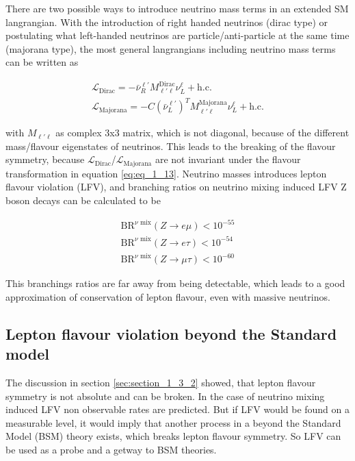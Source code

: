 There are two possible ways to introduce neutrino mass terms in an extended \gls{SM} langrangian. With the introduction of right handed neutrinos (dirac type) or postulating what left-handed neutrinos are particle/anti-particle at the same time (majorana type), the most general langrangians including neutrino mass terms \cite{NEUTRINOMASS} can be written as 

\begin{equation}
	\label{eq:eq_1_15}
	\begin{split}
		\mathcal{L}_{\text{Dirac}} = -\bar{\nu}^{\ell'}_{R}M^{\text{Dirac}}_{\ell'\ell} \nu^{\ell}_{L} + \text{h.c.} \\
		\mathcal{L}_{\text{Majorana}} = -C(\bar{\nu}^{\ell'}_{L})^{T}M^{\text{Majorana}}_{\ell'\ell} \nu^{\ell}_{L} + \text{h.c.} 
	\end{split}
\end{equation}

with $M_{\ell'\ell}$ as complex 3x3 matrix, which is not diagonal, because of the different mass/flavour eigenstates of neutrinos. This leads to the breaking of the flavour symmetry, because $\mathcal{L}_{\text{Dirac}}$/$\mathcal{L}_{\text{Majorana}}$ are not invariant under the flavour transformation in equation \ref{eq:eq_1_13}. Neutrino masses introduces lepton flavour violation (\gls{LFV}), and branching ratios on neutrino mixing induced \gls{LFV} Z boson decays \cite{NEUTRINOLFV} can be calculated to be 

\begin{equation}
	\label{eq:eq_1_16}
	\begin{split}
		\text{BR}^{\nu \text{ mix}}(Z\to e\mu) < 10^{-55} \\
		\text{BR}^{\nu \text{ mix}}(Z\to e\tau) < 10^{-54} \\
		\text{BR}^{\nu \text{ mix}}(Z\to \mu\tau) < 10^{-60}
	\end{split}
\end{equation}

This branchings ratios are far away from being detectable, which leads to a good approximation of conservation of lepton flavour, even with massive neutrinos.

\subsection{Lepton flavour violation beyond the Standard model}
\label{sec:section_1_3_3}

The discussion in section \ref{sec:section_1_3_2} showed, that lepton flavour symmetry is not absolute and can be broken. In the case of neutrino mixing induced \gls{LFV} non observable rates are predicted. But if \gls{LFV} would be found on a measurable level, it would imply that another process in a beyond the Standard Model (\gls{BSM}) theory exists, which breaks lepton flavour symmetry. So \gls{LFV} can be used as a probe and a getway to \gls{BSM} theories. \\

